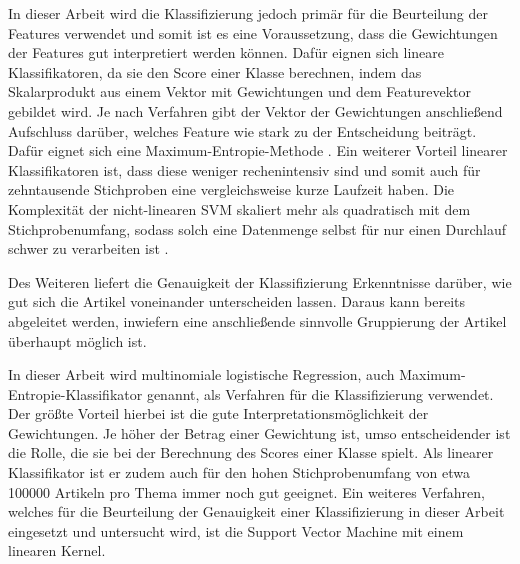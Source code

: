 In dieser Arbeit wird die Klassifizierung jedoch primär für die Beurteilung der Features verwendet und somit ist es eine Voraussetzung, dass die Gewichtungen der Features gut interpretiert werden können. Dafür eignen sich lineare Klassifikatoren, da sie den Score einer Klasse berechnen, indem das Skalarprodukt aus einem Vektor mit Gewichtungen und dem Featurevektor gebildet wird. Je nach Verfahren gibt der Vektor der Gewichtungen anschließend Aufschluss darüber, welches Feature wie stark zu der Entscheidung beiträgt. Dafür eignet sich eine Maximum-Entropie-Methode \cite[K.~2]{cimino2017identifying}. Ein weiterer Vorteil linearer Klassifikatoren ist, dass diese weniger rechenintensiv sind und somit auch für zehntausende Stichproben eine vergleichsweise kurze Laufzeit haben. Die Komplexität der nicht-linearen SVM skaliert mehr als quadratisch mit dem Stichprobenumfang, sodass solch eine Datenmenge selbst für nur einen Durchlauf schwer zu verarbeiten ist \cite[Seite: sklearn.svm.SVC]{scikitlearnAPIReference}.

Des Weiteren liefert die Genauigkeit der Klassifizierung Erkenntnisse darüber, wie gut sich die Artikel voneinander unterscheiden lassen. Daraus kann bereits abgeleitet werden, inwiefern eine anschließende sinnvolle Gruppierung der Artikel überhaupt möglich ist.

In dieser Arbeit wird multinomiale logistische Regression, auch Maximum-Entropie-Klassifikator genannt, als Verfahren für die Klassifizierung verwendet. Der größte Vorteil hierbei ist die gute Interpretationsmöglichkeit der Gewichtungen. Je höher der Betrag einer Gewichtung ist, umso entscheidender ist die Rolle, die sie bei der Berechnung des Scores einer Klasse spielt. Als linearer Klassifikator ist er zudem auch für den hohen Stichprobenumfang von etwa 100000 Artikeln pro Thema immer noch gut geeignet. Ein weiteres Verfahren, welches für die Beurteilung der Genauigkeit einer Klassifizierung in dieser Arbeit eingesetzt und untersucht wird, ist die Support Vector Machine mit einem linearen Kernel.

